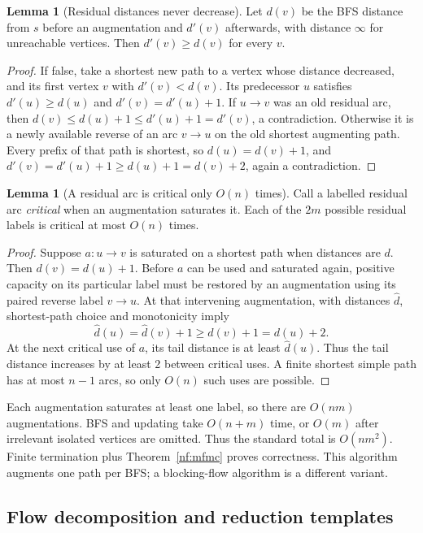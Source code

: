 \documentclass[10pt]{article}
\theoremstyle{definition}
\newtheorem{lemma}[definition]{Lemma}
\begin{document}
\begin{lemma}[Residual distances never decrease]\label{nf:distance}
Let $d(v)$ be the BFS distance from $s$ before an augmentation and $d'(v)$
afterwards, with distance $\infty$ for unreachable vertices. Then
$d'(v)\ge d(v)$ for every $v$.
\end{lemma}
\begin{proof}
If false, take a shortest new path to a vertex whose distance decreased,
and its first vertex $v$ with $d'(v)<d(v)$. Its predecessor $u$ satisfies
$d'(u)\ge d(u)$ and $d'(v)=d'(u)+1$. If $u\to v$ was an old residual arc,
then $d(v)\le d(u)+1\le d'(u)+1=d'(v)$, a contradiction.
Otherwise it is a newly available reverse of an arc $v\to u$ on the old
shortest augmenting path. Every prefix of that path is shortest, so
$d(u)=d(v)+1$, and
$d'(v)=d'(u)+1\ge d(u)+1=d(v)+2$, again a contradiction.
\end{proof}

\begin{lemma}[A residual arc is critical only $O(n)$ times]\label{nf:critical}
Call a labelled residual arc \emph{critical} when an augmentation saturates
it. Each of the $2m$ possible residual labels is critical at most $O(n)$ times.
\end{lemma}
\begin{proof}
Suppose $a:u\to v$ is saturated on a shortest path when distances are $d$.
Then $d(v)=d(u)+1$. Before $a$ can be used and saturated again, positive
capacity on its particular label must be restored by an augmentation using
its paired reverse label $v\to u$. At that intervening augmentation, with
distances $\widehat d$, shortest-path choice and monotonicity imply
\[
 \widehat d(u)=\widehat d(v)+1\ge d(v)+1=d(u)+2.
\]
At the next critical use of $a$, its tail distance is at least
$\widehat d(u)$. Thus the tail distance increases by at least 2 between
critical uses. A finite shortest simple path has at most $n-1$ arcs, so only
$O(n)$ such uses are possible.
\end{proof}
Each augmentation saturates at least one label, so there are $O(nm)$
augmentations. BFS and updating take $O(n+m)$ time, or $O(m)$ after irrelevant
isolated vertices are omitted. Thus the standard total is $O(nm^2)$.
Finite termination plus Theorem~\ref{nf:mfmc} proves correctness.
This algorithm augments one path per BFS; a blocking-flow algorithm is a
different variant.

\subsection{Flow decomposition and reduction templates}\label{nf:reductions}
\end{document}
